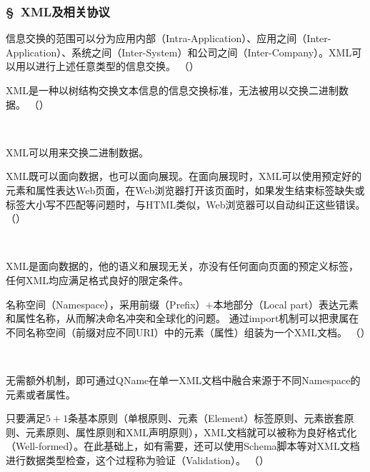 \subsubsection*{\S\ XML及相关协议}
\setcounter{problemname}{0}

\begin{problem}
	信息交换的范围可以分为应用内部（Intra-Application）、应用之间（Inter-Application）、系统之间（Inter-System）和公司之间（Inter-Company）。XML可以用以进行上述任意类型的信息交换。
	\hfill （）
\end{problem}


\begin{problem}
	XML是一种以树结构交换文本信息的信息交换标准，无法被用以交换二进制数据。
	\hfill （）
\end{problem}
\\ \begin{solution}
	XML可以用来交换二进制数据。
\end{solution}


\begin{problem}
	XML既可以面向数据，也可以面向展现。在面向展现时，XML可以使用预定好的元素和属性表达Web页面，在Web浏览器打开该页面时，如果发生结束标签缺失或标签大小写不匹配等问题时，与HTML类似，Web浏览器可以自动纠正这些错误。
	\hfill （）
\end{problem}
\\ \begin{solution}
	XML是面向数据的，他的语义和展现无关，亦没有任何面向页面的预定义标签，任何XML均应满足格式良好的限定条件。
\end{solution}


\begin{problem}
	名称空间（Namespace），采用前缀（Prefix）$+$本地部分（Local part）表达元素和属性名称，从而解决命名冲突和全球化的问题。 通过import机制可以把隶属在不同名称空间（前缀对应不同URI）中的元素（属性）组装为一个XML文档。
	\hfill （）
\end{problem}
\\ \begin{solution}
	无需额外机制，即可通过QName在单一XML文档中融合来源于不同Namespace的元素或者属性。
\end{solution}


\begin{problem}
	只要满足$5+1$条基本原则（单根原则、元素（Element）标签原则、元素嵌套原则、元素原则、属性原则和XML声明原则），XML文档就可以被称为良好格式化（Well-formed）。在此基础上，如有需要，还可以使用Schema脚本等对XML文档进行数据类型检查，这个过程称为验证（Validation）。
	\hfill （）
\end{problem}


